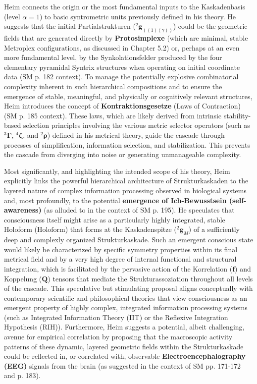 \documentclass[12pt]{article}
\newcommand{\holoform}{\text{Holoform}}
\newcommand{\kompositionsfeld}{{}^2\mathbf{g}}
\newcommand{\partialstruktur}[1]{{}^2\mathbf{g}_{(#1)}} %
\newcommand{\fundamentalkondensor}{{}^3\bm{\Gamma}}
\newcommand{\korrelationstensor}{\mathbf{f}}
\newcommand{\koppelungstensor}{\mathbf{Q}}
\newcommand{\kaskadenstufe}{\alpha}
\newcommand{\strukturkompressor}{{}^4\bm{\zeta}}
\begin{document}
Heim connects the origin or the most fundamental inputs to the Kaskadenbasis (level \( \kaskadenstufe=1 \)) to basic syntrometric units previously defined in his theory. He suggests that the initial Partialstrukturen (\( \partialstruktur{(1)(\gamma)} \)) could be the geometric fields that are generated directly by \textbf{Protosimplexe} (which are minimal, stable Metroplex configurations, as discussed in Chapter 5.2) or, perhaps at an even more fundamental level, by the Synkolationsfelder produced by the four elementary pyramidal Syntrix structures when operating on initial coordinate data (SM p. 182 context). To manage the potentially explosive combinatorial complexity inherent in such hierarchical compositions and to ensure the emergence of stable, meaningful, and physically or cognitively relevant structures, Heim introduces the concept of \textbf{Kontraktionsgesetze} (Laws of Contraction) (SM p. 185 context). These laws, which are likely derived from intrinsic stability-based selection principles involving the various metric selector operators (such as \( \fundamentalkondensor \), \( \strukturkompressor \), and \( {}^2\bm{\rho} \)) defined in his metrical theory, guide the cascade through processes of simplification, information selection, and stabilization. This prevents the cascade from diverging into noise or generating unmanageable complexity.

Most significantly, and highlighting the intended scope of his theory, Heim explicitly links the powerful hierarchical architecture of Strukturkaskaden to the layered nature of complex information processing observed in biological systems and, most profoundly, to the potential \textbf{emergence of Ich-Bewusstsein (self-awareness)} (as alluded to in the context of SM p. 195). He speculates that consciousness itself might arise as a particularly highly integrated, stable Holoform (\(\holoform\)) that forms at the Kaskadenspitze (\( \kompositionsfeld_M \)) of a sufficiently deep and complexly organized Strukturkaskade. Such an emergent conscious state would likely be characterized by specific symmetry properties within its final metrical field and by a very high degree of internal functional and structural integration, which is facilitated by the pervasive action of the Korrelation (\( \korrelationstensor \)) and Koppelung (\( \koppelungstensor \)) tensors that mediate the Strukturassoziation throughout all levels of the cascade. This speculative but stimulating proposal aligns conceptually with contemporary scientific and philosophical theories that view consciousness as an emergent property of highly complex, integrated information processing systems (such as Integrated Information Theory (IIT) or the Reflexive Integration Hypothesis (RIH)). Furthermore, Heim suggests a potential, albeit challenging, avenue for empirical correlation by proposing that the macroscopic activity patterns of these dynamic, layered geometric fields within the Strukturkaskade could be reflected in, or correlated with, observable \textbf{Electroencephalography (EEG)} signals from the brain (as suggested in the context of SM pp. 171-172 and p. 183).
\end{document}

